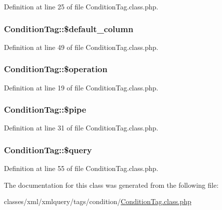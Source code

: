 Definition at line 25 of file Condition\+Tag.\+class.\+php.

\hypertarget{classConditionTag_ac401b3684262dd2a0ff53ff9a97864fe}{
\subsubsection[{\$default\+\_\+column}]{\setlength{\rightskip}{0pt plus 5cm}Condition\+Tag\+::\$default\+\_\+column}}\label{classConditionTag_ac401b3684262dd2a0ff53ff9a97864fe}


Definition at line 49 of file Condition\+Tag.\+class.\+php.

\hypertarget{classConditionTag_a0f8be8743e1e43b334ee1b46d25fd02e}{
\subsubsection[{\$operation}]{\setlength{\rightskip}{0pt plus 5cm}Condition\+Tag\+::\$operation}}\label{classConditionTag_a0f8be8743e1e43b334ee1b46d25fd02e}


Definition at line 19 of file Condition\+Tag.\+class.\+php.

\hypertarget{classConditionTag_a52a8251ff965af25e284262fab02f7f5}{
\subsubsection[{\$pipe}]{\setlength{\rightskip}{0pt plus 5cm}Condition\+Tag\+::\$pipe}}\label{classConditionTag_a52a8251ff965af25e284262fab02f7f5}


Definition at line 31 of file Condition\+Tag.\+class.\+php.

\hypertarget{classConditionTag_ab186510e6366ad1033cc9d73cedf1f02}{
\subsubsection[{\$query}]{\setlength{\rightskip}{0pt plus 5cm}Condition\+Tag\+::\$query}}\label{classConditionTag_ab186510e6366ad1033cc9d73cedf1f02}


Definition at line 55 of file Condition\+Tag.\+class.\+php.



The documentation for this class was generated from the following file\+:\begin{DoxyCompactItemize}
\item 
classes/xml/xmlquery/tags/condition/\hyperlink{ConditionTag_8class_8php}{Condition\+Tag.\+class.\+php}\end{DoxyCompactItemize}
